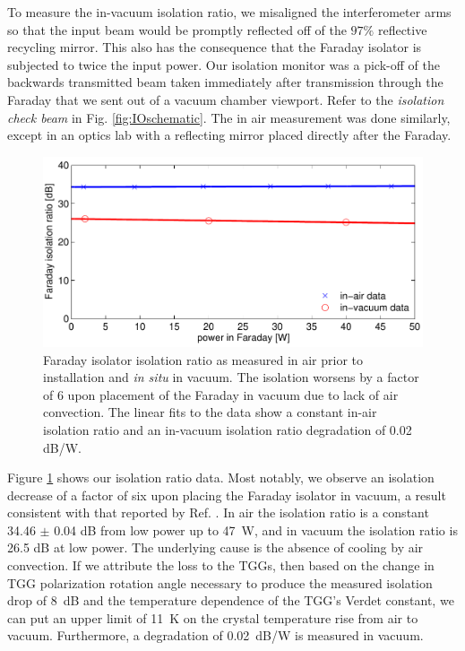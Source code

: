 To measure the in-vacuum isolation ratio, we misaligned the
interferometer arms so that the input beam would be 
promptly reflected off of the $97\%$ reflective recycling mirror. This
also has the consequence that 
the Faraday isolator is subjected to twice the input
power. Our isolation monitor was a pick-off of the backwards 
transmitted beam taken immediately after transmission
through the Faraday that we sent out of a vacuum chamber
viewport. Refer to the \emph{isolation check beam} in 
Fig. \ref{fig:IOschematic}. The in air measurement was done similarly,
except in an optics lab with a reflecting mirror placed directly after
the Faraday. 

\begin{figure}
\begin{centering}
\includegraphics[width=1.0\columnwidth]{figures/FaradayIR.pdf}
\caption[Faraday isolator isolation ratio as measured in air and in
vacuum]{Faraday isolator isolation ratio as measured in air prior to
  installation and \emph{in situ} in vacuum. The isolation worsens by
  a factor of 6 upon placement of the Faraday in vacuum due to lack of
  air convection. The linear fits to the data show a constant in-air
  isolation ratio and an in-vacuum isolation ratio degradation of 0.02
  dB/W.}
\label{fig:IR}
\end{centering}
\end{figure}

Figure \ref{fig:IR} shows our isolation ratio data. Most notably, we
observe an isolation decrease of a factor of six upon placing the
Faraday isolator in vacuum, a result consistent with that reported by
Ref. \citep{TheVIRGOCollaboration2008Invacuum}. In air the isolation
ratio is a constant 34.46 $\pm$ 0.04 dB from low power up to 47~W, and
in vacuum the isolation ratio is 26.5 dB at low power. The underlying
cause is the absence of cooling by air convection. If we attribute the
loss to the TGGs, then based on the change in TGG polarization
rotation angle necessary to produce the measured isolation drop of
8~dB and the temperature dependence of the TGG's Verdet constant, we
can put an upper limit of 11~K on the crystal temperature rise from
air to vacuum. Furthermore, a degradation of 0.02~dB/W is measured in
vacuum.

